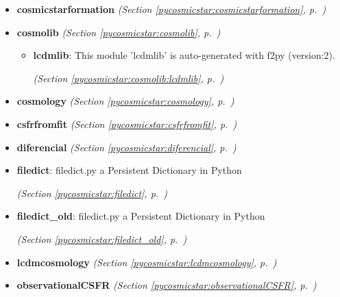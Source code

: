 \begin{itemize}
\setlength{\parskip}{0ex}
\item \textbf{cosmicstarformation}
  \textit{(Section \ref{pycosmicstar:cosmicstarformation}, p.~\pageref{pycosmicstar:cosmicstarformation})}

\item \textbf{cosmolib}
  \textit{(Section \ref{pycosmicstar:cosmolib}, p.~\pageref{pycosmicstar:cosmolib})}

  \begin{itemize}
\setlength{\parskip}{0ex}
    \item \textbf{lcdmlib}: This module 'lcdmlib' is auto-generated with f2py (version:2).



  \textit{(Section \ref{pycosmicstar:cosmolib:lcdmlib}, p.~\pageref{pycosmicstar:cosmolib:lcdmlib})}

  \end{itemize}
\item \textbf{cosmology}
  \textit{(Section \ref{pycosmicstar:cosmology}, p.~\pageref{pycosmicstar:cosmology})}

\item \textbf{csfrfromfit}
  \textit{(Section \ref{pycosmicstar:csfrfromfit}, p.~\pageref{pycosmicstar:csfrfromfit})}

\item \textbf{diferencial}
  \textit{(Section \ref{pycosmicstar:diferencial}, p.~\pageref{pycosmicstar:diferencial})}

\item \textbf{filedict}: filedict.py a Persistent Dictionary in Python



  \textit{(Section \ref{pycosmicstar:filedict}, p.~\pageref{pycosmicstar:filedict})}

\item \textbf{filedict\_old}: filedict.py a Persistent Dictionary in Python



  \textit{(Section \ref{pycosmicstar:filedict_old}, p.~\pageref{pycosmicstar:filedict_old})}

\item \textbf{lcdmcosmology}
  \textit{(Section \ref{pycosmicstar:lcdmcosmology}, p.~\pageref{pycosmicstar:lcdmcosmology})}

\item \textbf{observationalCSFR}
  \textit{(Section \ref{pycosmicstar:observationalCSFR}, p.~\pageref{pycosmicstar:observationalCSFR})}


\end{itemize}
